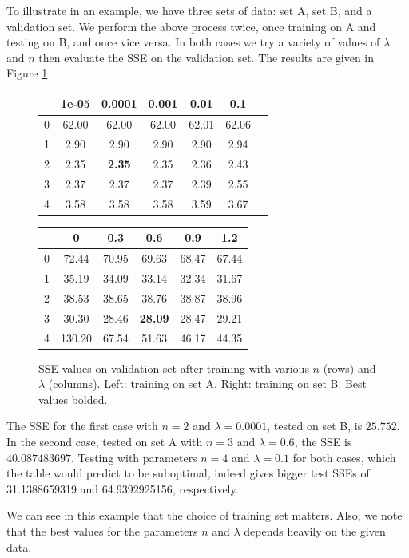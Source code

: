 \documentclass[10pt]{paper}
\begin{document}
To illustrate in an example, we have three sets of data: set A, set B, and a validation set. We perform the above process twice, once training on A and testing on B, and once vice versa. In both cases we try a variety of values of $\lambda$ and $n$ then evaluate the SSE on the validation set. The results are given in Figure \ref{fig:validationtable}
\begin{figure}[ht!]
  \centering
  \label{fig:validationtable}
  \begin{tabular}{c|cccccc}
    & 1e-05 & 0.0001 & 0.001 & 0.01 & 0.1 \\ \hline
  0 & 62.00 & 62.00 & 62.00 & 62.01 & 62.06 \\
  1 & 2.90 & 2.90 & 2.90 & 2.90 & 2.94 \\
  2 & 2.35 & \textbf{2.35} & 2.35 & 2.36 & 2.43 \\
  3 & 2.37 & 2.37 & 2.37 & 2.39 & 2.55 \\
  4 & 3.58 & 3.58 & 3.58 & 3.59 & 3.67 \\
  \end{tabular}
  \qquad
  \begin{tabular}{c|ccccc}
    & 0 & 0.3 & 0.6 & 0.9 & 1.2 \\ \hline
  0 & 72.44 & 70.95 & 69.63 & 68.47 & 67.44 \\
  1 & 35.19 & 34.09 & 33.14 & 32.34 & 31.67 \\
  2 & 38.53 & 38.65 & 38.76 & 38.87 & 38.96 \\
  3 & 30.30 & 28.46 & \textbf{28.09} & 28.47 & 29.21 \\
  4 & 130.20 & 67.54 & 51.63 & 46.17 & 44.35 \\
  \end{tabular}
  \caption{SSE values on validation set after training with various $n$ (rows) and $\lambda$ (columns). Left: training on set A. Right: training on set B. Best values bolded.}
\end{figure}
The SSE for the first case with $n = 2$ and $\lambda = 0.0001$, tested on set B, is $25.752$. In the second case, tested on set A with $n = 3$ and $\lambda = 0.6$, the SSE is $40.087483697$. Testing with parameters $n=4$ and $\lambda = 0.1$ for both cases, which the table would predict to be suboptimal, indeed gives bigger test SSEs of 31.1388659319 and 64.9392925156, respectively.

We can see in this example that the choice of training set matters. Also, we note that the best values for the parameters $n$ and $\lambda$ depends heavily on the given data.
\end{document}
